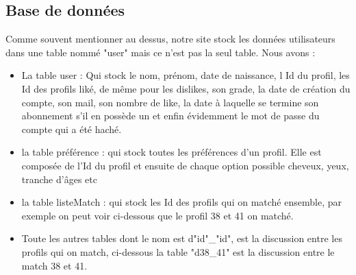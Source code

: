 \documentclass[12pt]{report}
\begin{document}
\subsection{Base de données}
	Comme souvent mentionner au dessus, notre site stock les données utilisateurs dans une table nommé "user" mais ce n'est pas la seul table. Nous avons : \\
\begin{itemize}
	\item La table user : Qui stock le nom, prénom, date de naissance, l Id du profil, les Id des profils liké, de même pour les dislikes, son grade, la date de création du compte, son mail, son nombre de like, la date à laquelle se termine son abonnement s'il en possède un et enfin évidemment le mot de passe du compte qui a été haché.
	\item la table préférence : qui stock toutes les préférences d'un profil. Elle est composée de l'Id du profil et ensuite de chaque option possible cheveux, yeux, tranche d'âges etc
	\item la table listeMatch : qui stock les Id des profils qui on matché ensemble, par exemple on peut voir ci-dessous que le profil 38 et 41 on matché.
	\item Toute les autres tables dont le nom est d"id"\_"id", est la discussion entre les profils qui on match, ci-dessous la table "d38\_41" est la discussion entre le match 38 et 41. 
\end{itemize}
\end{document}
